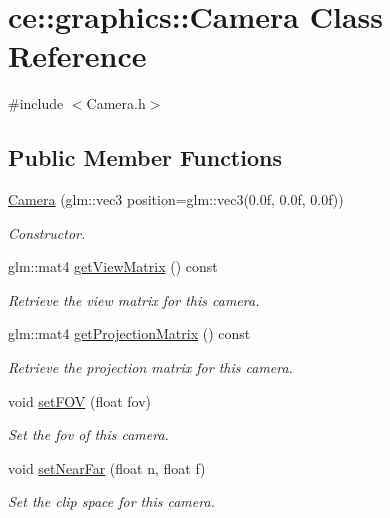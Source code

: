 \hypertarget{classce_1_1graphics_1_1_camera}{}\section{ce\+:\+:graphics\+:\+:Camera Class Reference}
\label{classce_1_1graphics_1_1_camera}


{\ttfamily \#include $<$Camera.\+h$>$}

\subsection*{Public Member Functions}
\begin{DoxyCompactItemize}
\item 
\hyperlink{classce_1_1graphics_1_1_camera_a8bfae7c979a6dab301e66939c48accee}{Camera} (glm\+::vec3 position=glm\+::vec3(0.\+0f, 0.\+0f, 0.\+0f))
\begin{DoxyCompactList}\small\item\em Constructor. \end{DoxyCompactList}\item 
glm\+::mat4 \hyperlink{classce_1_1graphics_1_1_camera_aa7934456509374221f1523a196af09fc}{get\+View\+Matrix} () const
\begin{DoxyCompactList}\small\item\em Retrieve the view matrix for this camera. \end{DoxyCompactList}\item 
glm\+::mat4 \hyperlink{classce_1_1graphics_1_1_camera_afa4fe84ad40fcea3a01e68c457b20e37}{get\+Projection\+Matrix} () const
\begin{DoxyCompactList}\small\item\em Retrieve the projection matrix for this camera. \end{DoxyCompactList}\item 
void \hyperlink{classce_1_1graphics_1_1_camera_a46c1c89dd83bcd2991d41e5b87555704}{set\+F\+OV} (float fov)
\begin{DoxyCompactList}\small\item\em Set the fov of this camera. \end{DoxyCompactList}\item 
void \hyperlink{classce_1_1graphics_1_1_camera_a0908e7c08307000941dd51f01e07e582}{set\+Near\+Far} (float n, float f)
\begin{DoxyCompactList}\small\item\em Set the clip space for this camera. \end{DoxyCompactList}\item 

\end{DoxyCompactItemize}
